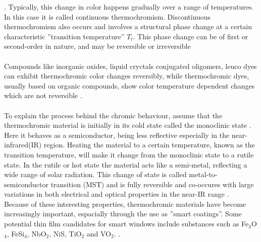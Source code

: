 \cite{Parkin2006} %
\cite{White1999}. %
Typically, this change in color happens gradually over a range of temperatures. In this case it is called
continuous thermochromism. Discontinuous thermochromism also occurs and involves a structural
phase change at a certain characteristic ''transition temperature'' $T_t$. This phase
change can be of first or second-order in nature, and may be reversible or irreversible 
\cite{BookMott1974}%
\\
\\
Compounds like inorganic oxides, liquid cryctals \cite{Seredyuk2006}%
conjugated oligomers, leuco dyes \cite{Seeboth2007} can exhibit thermochromic 
color changes reversibly, while thermochromic dyes, usually based on organic 
compounds, show color temperature dependent changes which are not reversible \cite{Kiri2010}.
\\
\\
To explain the process behind the chromic behaviour, assume that the thermochromic material is initially 
in its cold state called the monoclinic state . 
Here it behaves as a semiconductor, being less reflective especially in the near-infrared(IR) region. 
Heating the material to a certain temperature, known as the transition temperature, 
will make it change from the monoclinic state to a 
rutile state. In the rutile or hot state the material acts like a semi-metal, reflecting 
a wide range of solar radiation. This change of state is called metal-to-semiconductor
transition (MST) \cite[p.~4565]{Blackman2009} and is fully reversible 
and co-occures with large variations in both electrical and optical properties in the near-IR range 
\cite{Morin1959}. 
\\
Because of these interesting properties, thermochromic materials have become increasingly important,
espacially through the use as ''smart coatings''.
Some potential thin film candidates for smart windows include substances such as
Fe$_3$O$_4$, FeSi$_4$, NbO$_2$, NiS, TiO$_2$ and VO$_2$. \cite{White1999}.






